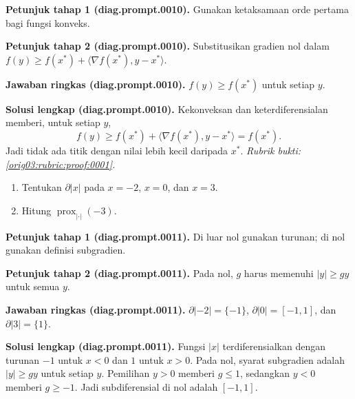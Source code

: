 \par\noindent\textbf{Petunjuk tahap 1 (diag.prompt.0010).}
Gunakan ketaksamaan orde pertama bagi fungsi konveks.
\label{orig03:diag:hint1:0010}
\par\noindent\textbf{Petunjuk tahap 2 (diag.prompt.0010).}
Substitusikan gradien nol dalam
$f(y)\geq f(x^*)+\langle\nabla f(x^*),y-x^*\rangle$.
\label{orig03:diag:hint2:0010}
\par\noindent\textbf{Jawaban ringkas (diag.prompt.0010).}
$f(y)\geq f(x^*)$ untuk setiap $y$.
\label{orig03:diag:answer:0010}
\par\noindent\textbf{Solusi lengkap (diag.prompt.0010).}
Kekonveksan dan keterdiferensialan memberi, untuk setiap $y$,
\[
f(y)\geq f(x^*)+\langle\nabla f(x^*),y-x^*\rangle=f(x^*).
\]
Jadi tidak ada titik dengan nilai lebih kecil daripada $x^*$.
\emph{Rubrik bukti: \ref{orig03:rubric:proof:0001}.}
\label{orig03:diag:solution:0010}

\begin{exercise}
\label{orig03:diag:problem:0006}
\begin{enumerate}
\item\label{orig03:diag:prompt:0011}
Tentukan $\partial|x|$ pada $x=-2$, $x=0$, dan $x=3$.
\item\label{orig03:diag:prompt:0012}
Hitung $\operatorname{prox}_{|\cdot|}(-3)$.
\end{enumerate}
\end{exercise}

\par\noindent\textbf{Petunjuk tahap 1 (diag.prompt.0011).}
Di luar nol gunakan turunan; di nol gunakan definisi subgradien.
\label{orig03:diag:hint1:0011}
\par\noindent\textbf{Petunjuk tahap 2 (diag.prompt.0011).}
Pada nol, $g$ harus memenuhi $|y|\geq gy$ untuk semua $y$.
\label{orig03:diag:hint2:0011}
\par\noindent\textbf{Jawaban ringkas (diag.prompt.0011).}
$\partial|-2|=\{-1\}$, $\partial|0|=[-1,1]$, dan
$\partial|3|=\{1\}$.
\label{orig03:diag:answer:0011}
\par\noindent\textbf{Solusi lengkap (diag.prompt.0011).}
Fungsi $|x|$ terdiferensialkan dengan turunan $-1$ untuk $x<0$ dan $1$
untuk $x>0$. Pada nol, syarat subgradien adalah $|y|\geq gy$ untuk setiap
$y$. Pemilihan $y>0$ memberi $g\leq1$, sedangkan $y<0$ memberi $g\geq-1$.
Jadi subdiferensial di nol adalah $[-1,1]$.
\label{orig03:diag:solution:0011}

